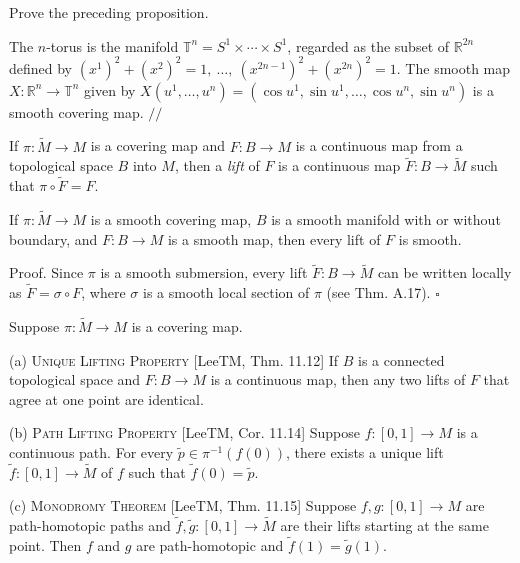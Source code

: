 \begin{exercise}
\label{exer:prove-prop-a50}
Prove the preceding proposition.
\end{exercise}

\begin{example}
\label{ex:covering-n-torus}
The $n$-torus is the manifold $\mathbb{T}^n = S^1 \times \cdots \times S^1$, regarded as the subset of $\mathbb{R}^{2n}$ defined by $(x^1)^2 + (x^2)^2 = 1,\ \ldots,\ (x^{2n-1})^2 + (x^{2n})^2 = 1$. The smooth map $X: \mathbb{R}^n \to \mathbb{T}^n$ given by $X(u^1, \ldots, u^n) = (\cos u^1, \sin u^1, \ldots, \cos u^n, \sin u^n)$ is a smooth covering map. $\mathbin{//}$
\end{example}

If $\pi: \tilde{M} \to M$ is a covering map and $F: B \to M$ is a continuous map from a topological space $B$ into $M$, then a \emph{lift} of $F$ is a continuous map $\tilde{F}: B \to \tilde{M}$ such that $\pi \circ \tilde{F} = F$.

\begin{proposition}
\label{prop:lifts-smooth-maps-smooth}
If $\pi: \tilde{M} \to M$ is a smooth covering map, $B$ is a smooth manifold with or without boundary, and $F: B \to M$ is a smooth map, then every lift of $F$ is smooth.

Proof. Since $\pi$ is a smooth submersion, every lift $\tilde{F}: B \to \tilde{M}$ can be written locally as $\tilde{F} = \sigma \circ F$, where $\sigma$ is a smooth local section of $\pi$ (see Thm. A.17). $\square$
\end{proposition}

\begin{proposition}
\label{prop:lifting-properties-covering}
\leanok
Suppose $\pi: \tilde{M} \to M$ is a covering map.

(a) \textsc{Unique Lifting Property} [LeeTM, Thm. 11.12] If $B$ is a connected topological space and $F: B \to M$ is a continuous map, then any two lifts of $F$ that agree at one point are identical.

(b) \textsc{Path Lifting Property} [LeeTM, Cor. 11.14] Suppose $f: [0,1] \to M$ is a continuous path. For every $\tilde{p} \in \pi^{-1}(f(0))$, there exists a unique lift $\tilde{f}: [0,1] \to \tilde{M}$ of $f$ such that $\tilde{f}(0) = \tilde{p}$.

(c) \textsc{Monodromy Theorem} [LeeTM, Thm. 11.15] Suppose $f, g: [0,1] \to M$ are path-homotopic paths and $\tilde{f}, \tilde{g}: [0,1] \to \tilde{M}$ are their lifts starting at the same point. Then $f$ and $g$ are path-homotopic and $\tilde{f}(1) = \tilde{g}(1)$.
\end{proposition}

